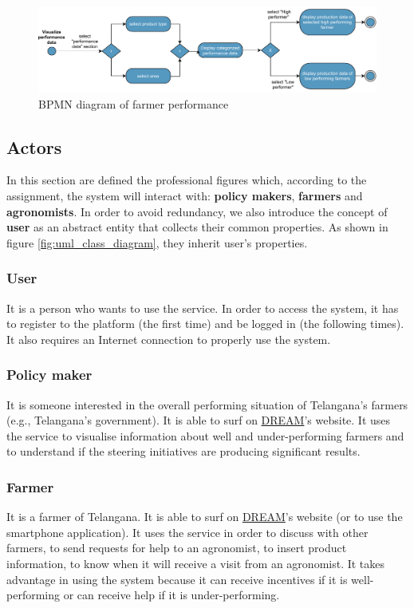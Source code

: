 \begin{figure}[H]
	\centering
    \includegraphics[width=\textwidth]{Images/BPMN/Performance.pdf}
	\caption{\label{fig:bpmn_performance}BPMN diagram of farmer performance}
\end{figure}

\subsection{Actors}
\label{sec:actors}
In this section are defined the professional figures which, according to the assignment, the system will interact with: \textbf{policy makers}, \textbf{farmers} and \textbf{agronomists}. In order to avoid redundancy, we also introduce the concept of \textbf{user} as an abstract entity that collects their common properties. As shown in figure \ref{fig:uml_class_diagram}, they inherit user's properties.
\subsubsection{User}
It is a person who wants to use the service. In order to access the system, it has to register to the platform (the first time) and be logged in (the following times). It also requires an Internet connection to properly use the system.
\subsubsection{Policy maker}
It is someone interested in the overall performing situation of Telangana’s farmers (e.g., Telangana’s government). It is able to surf on \hyperref[tab:acronymsTable]{DREAM}’s website. It uses the service to visualise information about well and under-performing farmers and to understand if the steering initiatives are producing significant results.
\subsubsection{Farmer}
It is a farmer of Telangana. It is able to surf on \hyperref[tab:acronymsTable]{DREAM}’s website (or to use the smartphone application). It uses the service in order to discuss with other farmers, to send requests for help to an agronomist, to insert product information, to know when it will receive a visit from an agronomist. It takes advantage in using the system because it can receive incentives if it is well-performing or can receive help if it is under-performing.
